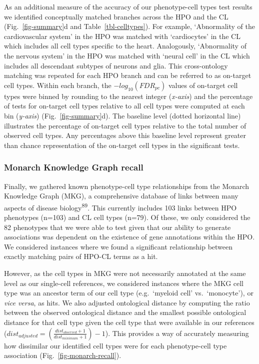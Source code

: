 \documentclass[
]{article}
\begin{document}
As an additional measure of the accuracy of our phenotype-cell types
test results we identified conceptually matched branches across the HPO
and the CL (Fig.~\ref{fig-summary}d and Table~\ref{tbl-celltypes}). For
example, `Abnormality of the cardiovascular system' in the HPO was
matched with `cardiocytes' in the CL which includes all cell types
specific to the heart. Analogously, `Abnormality of the nervous system'
in the HPO was matched with `neural cell' in the CL which includes all
descendant subtypes of neurons and glia. This cross-ontology matching
was repeated for each HPO branch and can be referred to as on-target
cell types. Within each branch, the \(-log_{10}(FDR _{pc})\) values of
on-target cell types were binned by rounding to the nearest integer
(\emph{x-axis}) and the percentage of tests for on-target cell types
relative to all cell types were computed at each bin (\emph{y-axis})
(Fig.~\ref{fig-summary}d). The baseline level (dotted horizontal line)
illustrates the percentage of on-target cell types relative to the total
number of observed cell types. Any percentages above this baseline level
represent greater than chance representation of the on-target cell types
in the significant tests.

\subsubsection{Monarch Knowledge Graph
recall}\label{monarch-knowledge-graph-recall-1}

Finally, we gathered known phenotype-cell type relationships from the
Monarch Knowledge Graph (MKG), a comprehensive database of links between
many aspects of disease biology\textsuperscript{89}. This currently
includes 103 links between HPO phenotypes (n=103) and CL cell types
(n=79). Of these, we only considered the 82 phenotypes that we were able
to test given that our ability to generate associations was dependent on
the existence of gene annotations within the HPO. We considered
instances where we found a significant relationship between exactly
matching pairs of HPO-CL terms as a hit.

However, as the cell types in MKG were not necessarily annotated at the
same level as our single-cell references, we considered instances where
the MKG cell type was an ancestor term of our cell type (e.g.~`myeloid
cell' vs.~`monocyte'), or \emph{vice versa}, as hits. We also adjusted
ontological distance by computing the ratio between the observed
ontological distance and the smallest possible ontological distance for
that cell type given the cell type that were available in our references
(\(dist_{adjusted}=(\frac{dist_{observed}+1}{dist_{minimum}+1})-1\)).
This provides a way of accurately measuring how dissimilar our
identified cell types were for each phenotype-cell type association
(Fig.~\ref{fig-monarch-recall}).
\end{document}

